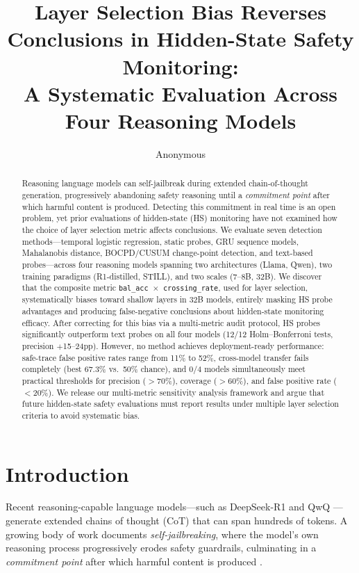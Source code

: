 \documentclass[11pt]{article}
\title{Layer Selection Bias Reverses Conclusions in Hidden-State Safety Monitoring:\\A Systematic Evaluation Across Four Reasoning Models}
\author{Anonymous}
\begin{document}
\maketitle

\begin{abstract}
Reasoning language models can self-jailbreak during extended chain-of-thought generation, progressively abandoning safety reasoning until a \emph{commitment point} after which harmful content is produced.
Detecting this commitment in real time is an open problem, yet prior evaluations of hidden-state (HS) monitoring have not examined how the choice of layer selection metric affects conclusions.
We evaluate seven detection methods---temporal logistic regression, static probes, GRU sequence models, Mahalanobis distance, BOCPD/CUSUM change-point detection, and text-based probes---across four reasoning models spanning two architectures (Llama, Qwen), two training paradigms (R1-distilled, STILL), and two scales (7--8B, 32B).
We discover that the composite metric \texttt{bal\_acc $\times$ crossing\_rate}, used for layer selection, systematically biases toward shallow layers in 32B models, entirely masking HS probe advantages and producing false-negative conclusions about hidden-state monitoring efficacy.
After correcting for this bias via a multi-metric audit protocol, HS probes significantly outperform text probes on all four models (12/12 Holm--Bonferroni tests, precision $+$15--24pp).
However, no method achieves deployment-ready performance: safe-trace false positive rates range from 11\% to 52\%, cross-model transfer fails completely (best 67.3\% vs.\ 50\% chance), and 0/4 models simultaneously meet practical thresholds for precision ($>$70\%), coverage ($>$60\%), and false positive rate ($<$20\%).
We release our multi-metric sensitivity analysis framework and argue that future hidden-state safety evaluations must report results under multiple layer selection criteria to avoid systematic bias.
\end{abstract}


\section{Introduction}

Recent reasoning-capable language models---such as DeepSeek-R1 \cite{deepseekai2025deepseekr1} and QwQ \cite{qwq32b}---generate extended chains of thought (CoT) that can span hundreds of tokens. A growing body of work documents \emph{self-jailbreaking}, where the model's own reasoning process progressively erodes safety guardrails, culminating in a \emph{commitment point} after which harmful content is produced \cite{wen2025thinkingmakesllmssusceptible,zhou2025hiddenriskslargereasoning}.
\end{document}
